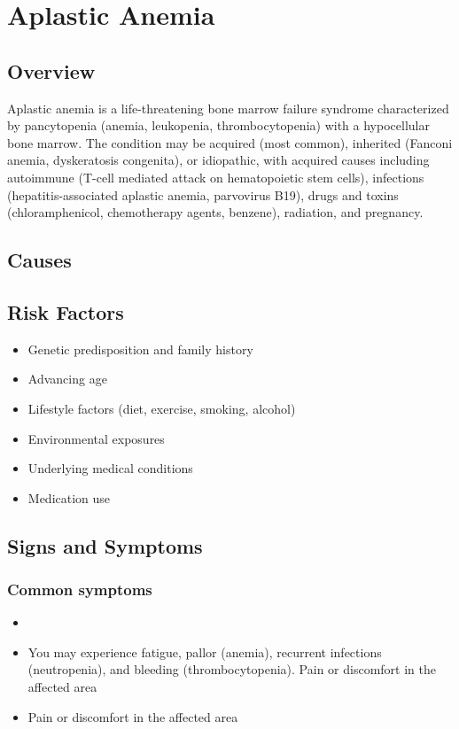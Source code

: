 \chapter{Aplastic Anemia}
\label{sec:Aplastic Anemia}

\section{Overview}
Aplastic anemia is a life-threatening bone marrow failure syndrome characterized by pancytopenia (anemia, leukopenia, thrombocytopenia) with a hypocellular bone marrow. The condition may be acquired (most common), inherited (Fanconi anemia, dyskeratosis congenita), or idiopathic, with acquired causes including autoimmune (T-cell mediated attack on hematopoietic stem cells), infections (hepatitis-associated aplastic anemia, parvovirus B19), drugs and toxins (chloramphenicol, chemotherapy agents, benzene), radiation, and pregnancy.
\section{Causes}
\section{Risk Factors}

\begin{itemize}[noitemsep]
  \item Genetic predisposition and family history
  \item Advancing age
  \item Lifestyle factors (diet, exercise, smoking, alcohol)
  \item Environmental exposures
  \item Underlying medical conditions
  \item Medication use
\end{itemize}
\section{Signs and Symptoms}

\subsection{Common symptoms}
\begin{itemize}[noitemsep]
  \item \item You may experience fatigue, pallor (anemia), recurrent infections (neutropenia), and bleeding (thrombocytopenia). Pain or discomfort in the affected area    \item Pain or discomfort in the affected area
  \end{itemize}

